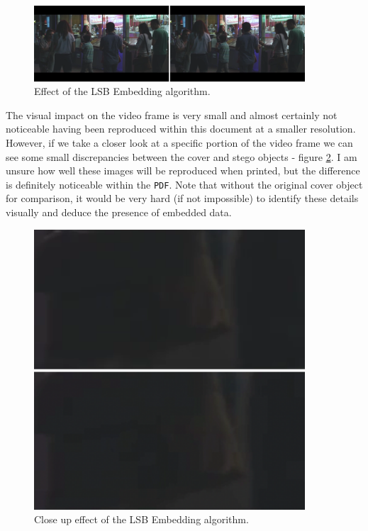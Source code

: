 \documentclass[paper=a4, fontsize=11pt,twoside]{scrartcl}    %
\numberwithin{table}{section}
\numberwithin{figure}{section}
\numberwithin{algorithm}{section}
\begin{document}
\begin{figure}[!h]
\centerline{\includegraphics[width=0.9\textwidth]{images/lsb_emb_full.png}}
\caption{Effect of the LSB Embedding algorithm.}
\label{lsbemb_full}
\end{figure}

\noindent
The visual impact on the video frame is very small and almost certainly not noticeable having been reproduced within this document at a smaller resolution. However, if we take a closer look at a specific portion of the video frame we can see some small discrepancies between the cover and stego objects - figure \ref{lsbcloseup}. I am unsure how well these images will be reproduced when printed, but the difference is definitely noticeable within the \texttt{PDF}. Note that without the original cover object for comparison, it would be very hard (if not impossible) to identify these details visually and deduce the presence of embedded data.

\begin{figure}
\centerline{\includegraphics[width=0.9\textwidth]{images/closeup_3.png}}
\caption{Close up effect of the LSB Embedding algorithm.}
\label{lsbcloseup}
\end{figure}
\end{document}
